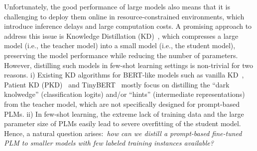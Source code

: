 \documentclass{article}
\begin{document}


Unfortunately, the good performance of large models also means that it is challenging to deploy them online in resource-constrained environments, which introduce inference delays and large computation costs. A promising approach to address this issue is Knowledge Distillation (KD)~\cite{DBLP:journals/ijcv/GouYMT21}, which compresses a large model (i.e., the teacher model) into a small model (i.e., the student model), preserving the model performance while reducing the number of parameters.
However, distilling such models in few-shot learning settings is non-trivial for two reasons. i) Existing KD algorithms for BERT-like models such as vanilla KD~\cite{DBLP:journals/corr/abs-1903-12136}, Patient KD (PKD)~\cite{DBLP:conf/emnlp/SunCGL19} and TinyBERT~\cite{DBLP:conf/emnlp/JiaoYSJCL0L20} mostly focus on distilling the ``dark knolwedge'' (classification logits) and/or ``hints'' (intermediate representations) from the teacher model, which are not specifically designed for prompt-based PLMs. ii) In few-shot learning, the extreme lack of training data and the large parameter size of PLMs easily lead to severe overfitting of the student model.
Hence, a natural question arises:~\emph{how can we distill a prompt-based fine-tuned PLM to smaller models with few labeled training instances available?}
\end{document}
